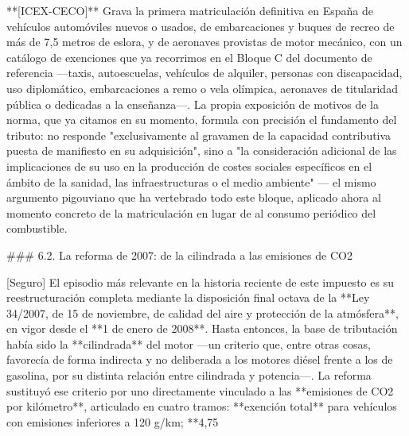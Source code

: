 \documentclass[10pt,a4paper]{article}
\begin{document}
**[ICEX-CECO]** Grava la primera matriculación definitiva en España de vehículos automóviles nuevos o usados, de embarcaciones y buques de recreo de más de 7,5 metros de eslora, y de aeronaves provistas de motor mecánico, con un catálogo de exenciones que ya recorrimos en el Bloque C del documento de referencia —taxis, autoescuelas, vehículos de alquiler, personas con discapacidad, uso diplomático, embarcaciones a remo o vela olímpica, aeronaves de titularidad pública o dedicadas a la enseñanza—. La propia exposición de motivos de la norma, que ya citamos en su momento, formula con precisión el fundamento del tributo: no responde "exclusivamente al gravamen de la capacidad contributiva puesta de manifiesto en su adquisición", sino a "la consideración adicional de las implicaciones de su uso en la producción de costes sociales específicos en el ámbito de la sanidad, las infraestructuras o el medio ambiente" — el mismo argumento pigouviano que ha vertebrado todo este bloque, aplicado ahora al momento concreto de la matriculación en lugar de al consumo periódico del combustible.

### 6.2. La reforma de 2007: de la cilindrada a las emisiones de CO2

[Seguro] El episodio más relevante en la historia reciente de este impuesto es su reestructuración completa mediante la disposición final octava de la **Ley 34/2007, de 15 de noviembre, de calidad del aire y protección de la atmósfera**, en vigor desde el **1 de enero de 2008**. Hasta entonces, la base de tributación había sido la **cilindrada** del motor —un criterio que, entre otras cosas, favorecía de forma indirecta y no deliberada a los motores diésel frente a los de gasolina, por su distinta relación entre cilindrada y potencia—. La reforma sustituyó ese criterio por uno directamente vinculado a las **emisiones de CO2 por kilómetro**, articulado en cuatro tramos: **exención total** para vehículos con emisiones inferiores a 120 g/km; **4,75%
\end{document}
